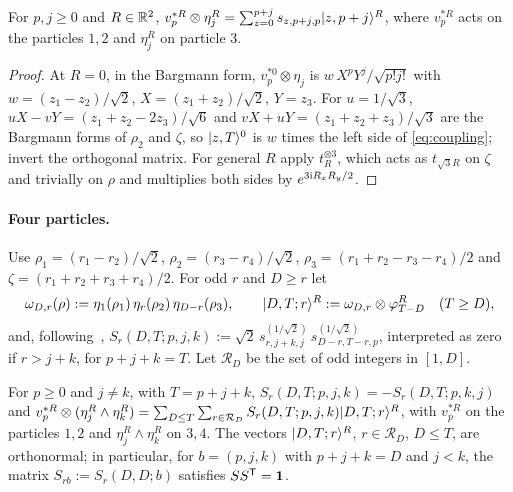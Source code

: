 \begin{lemma}\label{lem:coupled3}
For $p,j\ge0$ and $R\in\mathbb{R}^2$, $v_p^{*R}\otimes\eta_j^R=\sum_{z=0}^{p+j}s_{z,p+j,p}\lvert z,p+j\rangle^R$, where $v_p^{*R}$ acts on the
particles $1,2$ and $\eta_j^R$ on particle $3$.
\end{lemma}

\begin{proof}
At $R=0$, in the Bargmann form, $v_p^{*0}\otimes\eta_j$ is $w\,X^pY^j/\sqrt{p!j!}$ with $w=(z_1-z_2)/\sqrt2$, $X=(z_1+z_2)/\sqrt2$,
$Y=z_3$. For $u=1/\sqrt3$, $uX-vY=(z_1+z_2-2z_3)/\sqrt6$ and $vX+uY=(z_1+z_2+z_3)/\sqrt3$ are the Bargmann forms of $\rho_2$ and
$\zeta$, so $\lvert z,T\rangle^0$ is $w$ times the left side of \eqref{eq:coupling}; invert the orthogonal matrix. For general $R$ apply
$t_R^{\otimes3}$, which acts as $t_{\sqrt3R}$ on $\zeta$ and trivially on $\rho$ and multiplies both sides by $e^{3\mathrm{i} R_xR_y/2}$.
\end{proof}

\paragraph{Four particles.} Use $\rho_1=(r_1-r_2)/\sqrt2$, $\rho_2=(r_3-r_4)/\sqrt2$, $\rho_3=(r_1+r_2-r_3-r_4)/2$ and
$\zeta=(r_1+r_2+r_3+r_4)/2$. For odd $r$ and $D\ge r$ let
\[
\omega_{D,r}(\rho):=\eta_1(\rho_1)\,\eta_r(\rho_2)\,\eta_{D-r}(\rho_3),\qquad \lvert D,T;r\rangle^R:=\omega_{D,r}\otimes\varphi^R_{T-D}\quad(T\ge D),
\]
and, following~\cite[Section~4.2, (23)]{OAI:A-Fock-space-inequality-and-the-Laughlin-spectral-gap-September-24-2026},
$S_r(D,T;p,j,k):=\sqrt2\,s^{(1/\sqrt2)}_{r,j+k,j}\,s^{(1/\sqrt2)}_{D-r,T-r,p}$, interpreted as zero if $r>j+k$, for $p+j+k=T$. Let
$\mathcal R_D$ be the set of odd integers in $[1,D]$.

\begin{lemma}\label{lem:coupled4}
For $p\ge0$ and $j\ne k$, with $T=p+j+k$, $S_r(D,T;p,j,k)=-S_r(D,T;p,k,j)$ and
$v_p^{*R}\otimes(\eta_j^R\wedge\eta_k^R)=\sum_{D\le T}\sum_{r\in\mathcal R_D}S_r(D,T;p,j,k)\lvert D,T;r\rangle^R$, with $v_p^{*R}$ on the
particles $1,2$ and $\eta_j^R\wedge\eta_k^R$ on $3,4$. The vectors $\lvert D,T;r\rangle^R$, $r\in\mathcal R_D$, $D\le T$, are orthonormal;
in particular, for $b=(p,j,k)$ with $p+j+k=D$ and $j<k$, the matrix $S_{rb}:=S_r(D,D;b)$ satisfies $SS^{\mathsf T}=\mathbf{1}$.
\end{lemma}

